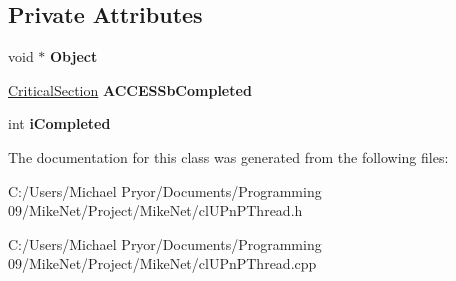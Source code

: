 \subsection*{Private Attributes}
\begin{DoxyCompactItemize}
\item 
\hypertarget{classcl_u_pn_p_thread_aa934c5b21b7f7bcde49a4e710f906288}{
void $\ast$ {\bfseries Object}}
\label{classcl_u_pn_p_thread_aa934c5b21b7f7bcde49a4e710f906288}

\item 
\hypertarget{classcl_u_pn_p_thread_ab50b27c937c7f3c1f81c3c1a0b8b1aee}{
\hyperlink{class_critical_section}{CriticalSection} {\bfseries ACCESSbCompleted}}
\label{classcl_u_pn_p_thread_ab50b27c937c7f3c1f81c3c1a0b8b1aee}

\item 
\hypertarget{classcl_u_pn_p_thread_acfc2e59b9bde74e1d2363965e647091e}{
int {\bfseries iCompleted}}
\label{classcl_u_pn_p_thread_acfc2e59b9bde74e1d2363965e647091e}

\end{DoxyCompactItemize}


The documentation for this class was generated from the following files:\begin{DoxyCompactItemize}
\item 
C:/Users/Michael Pryor/Documents/Programming 09/MikeNet/Project/MikeNet/clUPnPThread.h\item 
C:/Users/Michael Pryor/Documents/Programming 09/MikeNet/Project/MikeNet/clUPnPThread.cpp\end{DoxyCompactItemize}
